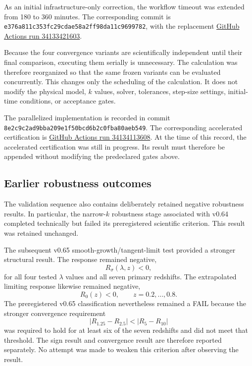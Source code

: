 As an initial infrastructure-only correction, the workflow timeout was extended from 180 to 360 minutes. The corresponding commit is \texttt{e376a811c353fc29cdae58a2ff98da11c9699782}, with the replacement \href{https://github.com/dvlahek/aest-memory-gravity/actions/runs/34133421603}{GitHub Actions run 34133421603}.

Because the four convergence variants are scientifically independent until their final comparison, executing them serially is unnecessary. The calculation was therefore reorganized so that the same frozen variants can be evaluated concurrently. This changes only the scheduling of the calculation. It does not modify the physical model, $k$ values, solver, tolerances, step-size settings, initial-time conditions, or acceptance gates.

The parallelized implementation is recorded in commit \texttt{8e2c9c2ad9bba209e1f50bcd6b2c0fba80aeb549}. The corresponding accelerated certification is \href{https://github.com/dvlahek/aest-memory-gravity/actions/runs/34134113608}{GitHub Actions run 34134113608}. At the time of this record, the accelerated certification was still in progress. Its result must therefore be appended without modifying the predeclared gates above.

\subsection{Earlier robustness outcomes}

The validation sequence also contains deliberately retained negative robustness results. In particular, the narrow-$k$ robustness stage associated with v0.64 completed technically but failed its preregistered scientific criterion. This result was retained unchanged.

The subsequent v0.65 smooth-growth/tangent-limit test provided a stronger structural result. The response remained negative,
\begin{equation}
R_{\sigma}(\lambda,z)<0,
\end{equation}
for all four tested $\lambda$ values and all seven primary redshifts. The extrapolated limiting response likewise remained negative,
\begin{equation}
R_0(z)<0,\qquad z=0.2,\ldots,0.8.
\end{equation}
The preregistered v0.65 classification nevertheless remained a FAIL because the stronger convergence requirement
\begin{equation}
|R_{1.25}-R_{2.5}|<|R_{5}-R_{10}|
\end{equation}
was required to hold for at least six of the seven redshifts and did not meet that threshold. The sign result and convergence result are therefore reported separately. No attempt was made to weaken this criterion after observing the result.

